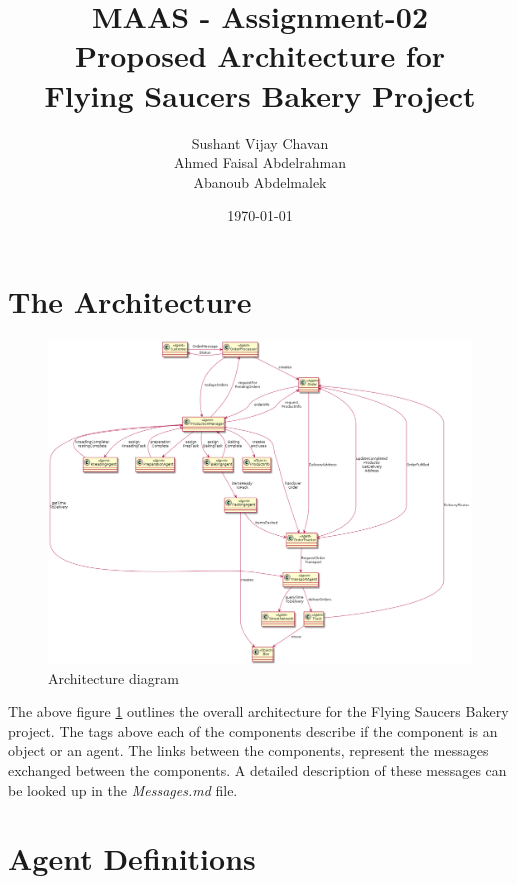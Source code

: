 \documentclass[11pt, a4paper]{article}
\title{MAAS - Assignment-02\\
Proposed Architecture for \\Flying Saucers Bakery Project}
\author{Sushant Vijay Chavan\\Ahmed Faisal Abdelrahman\\Abanoub Abdelmalek}
\date{\today}
\begin{document}
\maketitle
\newpage
\newpage

\section{The Architecture}
\begin{figure}[h!]
	\centering
	\includegraphics[angle=90, scale=0.385]{../Bakery.png}
	\caption{Architecture diagram}
	\label{Architecture diagram}
\end{figure}
The above figure \ref{Architecture diagram} outlines the overall architecture for the Flying Saucers Bakery project. The tags  above each of the components describe if the component is an object or an agent. The links between the components, represent the messages exchanged between the components. A detailed description of these messages can be looked up in the \textit{Messages.md} file.

\section{Agent Definitions}
\end{document}
